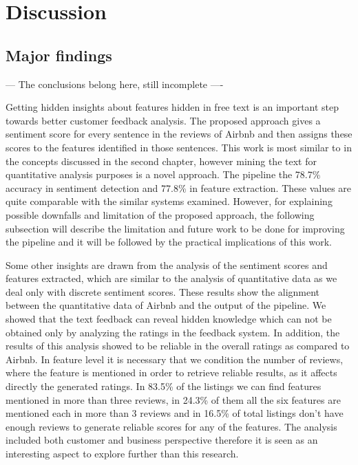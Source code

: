%
%
\let\textcircled=\pgftextcircled
\chapter{Discussion}
\label{chap:dis}
\section{Major findings}
--- The conclusions belong here, still incomplete ----

Getting hidden insights about features hidden in free text is an important step towards better customer feedback analysis. The proposed approach gives a sentiment score for every sentence in the reviews of Airbnb and then assigns these scores to the features identified in those sentences. This work is most similar to \cite{eirinaki2012feature,ali2015type,penalver2014feature} in the concepts discussed in the second chapter, however mining the text for quantitative analysis purposes is a novel approach. The pipeline the 78.7\% accuracy in sentiment detection and 77.8\% in feature extraction. These values are quite comparable with the similar systems examined. However, for explaining possible downfalls and limitation of the proposed approach, the following subsection will describe the limitation and future work to be done for improving the pipeline and it will be followed by the practical implications of this work. 

Some other insights are drawn from the analysis of the sentiment scores and features extracted, which are similar to the analysis of quantitative data as we deal only with discrete sentiment scores. These results show the alignment between the quantitative data of Airbnb and the output of the pipeline. We showed that the text feedback can reveal hidden knowledge which can not be obtained only by analyzing the ratings in the feedback system. In addition, the results of this analysis showed to be reliable in the overall ratings as compared to Airbnb. In feature level it is necessary that we condition the number of reviews, where the feature is mentioned in order to retrieve reliable results, as it affects directly the generated ratings. In 83.5\% of the listings we can find features mentioned in more than three reviews, in 24.3\% of them all the six features are mentioned each in more than 3 reviews and in 16.5\% of total listings don't have enough reviews to generate reliable scores for any of the features. The analysis included both customer and business perspective therefore it is seen as an interesting aspect to explore further than this research. 

